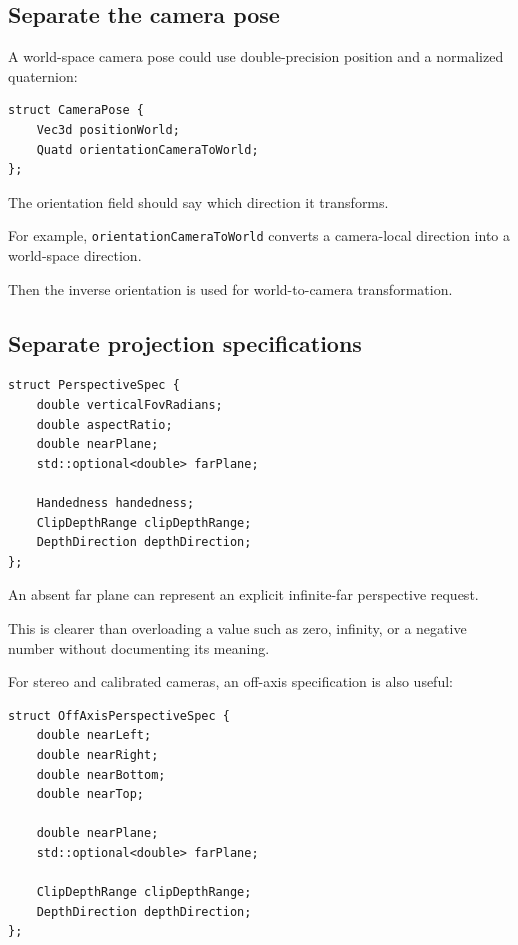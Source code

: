 \subsection{Separate the camera pose}\label{02-foundations-ii-ch037-separate-the-camera-pose}

A world-space camera pose could use double-precision position and a normalized quaternion:

\begin{verbatim}
struct CameraPose {
    Vec3d positionWorld;
    Quatd orientationCameraToWorld;
};
\end{verbatim}

The orientation field should say which direction it transforms.

For example, \texttt{orientationCameraToWorld} converts a camera-local direction into a world-space direction.

Then the inverse orientation is used for world-to-camera transformation.

\subsection{Separate projection specifications}\label{02-foundations-ii-ch037-separate-projection-specifications}

\begin{verbatim}
struct PerspectiveSpec {
    double verticalFovRadians;
    double aspectRatio;
    double nearPlane;
    std::optional<double> farPlane;

    Handedness handedness;
    ClipDepthRange clipDepthRange;
    DepthDirection depthDirection;
};
\end{verbatim}

An absent far plane can represent an explicit infinite-far perspective request.

This is clearer than overloading a value such as zero, infinity, or a negative number without documenting its meaning.

For stereo and calibrated cameras, an off-axis specification is also useful:

\begin{verbatim}
struct OffAxisPerspectiveSpec {
    double nearLeft;
    double nearRight;
    double nearBottom;
    double nearTop;

    double nearPlane;
    std::optional<double> farPlane;

    ClipDepthRange clipDepthRange;
    DepthDirection depthDirection;
};
\end{verbatim}

